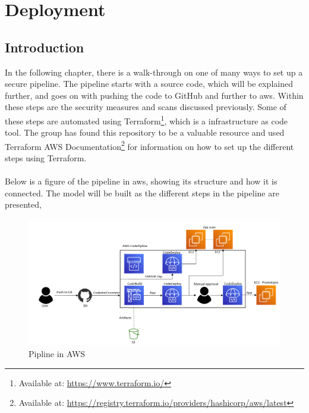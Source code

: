 \chapter{Deployment}
\label{Deployment}
\section{Introduction}
In the following chapter, there is a walk-through on one of many ways to set up a secure pipeline. The pipeline starts with a source code, which will be explained further, and goes on with pushing the code to GitHub and further to \acrshort{aws}. Within these steps are the security measures and scans discussed previously. Some of these steps are automated using Terraform\footnote{Available at: \url{https://www.terraform.io/}}, which is a \gls{infrastructure as code} tool. The group has found this repository to be a valuable resource \cite{aws-cicd-pipeline} and used Terraform AWS Documentation\footnote{Available at: \url{https://registry.terraform.io/providers/hashicorp/aws/latest}} for information on how to set up the different steps using Terraform. 
\\~\\
Below is a figure of the pipeline in \acrshort{aws}, showing its structure and how it is connected. The model will be built as the different steps in the pipeline are presented, 



\vspace{2mm}
\begin{figure}[H]
    \centering
    \includegraphics[width=0.8\columnwidth]{Images/aws-piplin-7.png}
    \caption{Pipline in AWS}
    \label{fig: Pipeline in AWS}
\end{figure}



